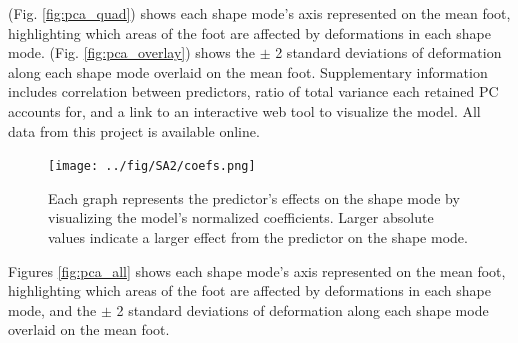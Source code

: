 \documentclass[defaultstyle,11pt]{comps}
\begin{document}
(Fig. \ref{fig:pca_quad}) shows each shape mode's axis represented on the mean foot, highlighting which areas of the foot are affected by deformations in each shape mode.
(Fig. \ref{fig:pca_overlay}) shows the \(\pm\) 2 standard deviations of deformation along each shape mode overlaid on the mean foot.
Supplementary information includes correlation between predictors, ratio of total variance each retained PC accounts for, and a link to an interactive web tool to visualize the model.
All data from this project is available online.

\begin{figure}
\hypertarget{fig:SA2-coefs}{%
\centering
\texttt{[image: ../fig/SA2/coefs.png]}
\caption{Each graph represents the predictor's effects on the shape mode by visualizing the model's normalized coefficients. Larger absolute values indicate a larger effect from the predictor on the shape mode.}\label{fig:SA2-coefs}
}
\end{figure}

Figures \ref{fig:pca_all} shows each shape mode's axis represented on the mean foot, highlighting which areas of the foot are affected by deformations in each shape mode, and the \(\pm\) 2 standard deviations of deformation along each shape mode overlaid on the mean foot.

\begin{pandoccrossrefsubfigures}



\caption[{{[}A{]} Each shape mode's principal axis represented as a heatmap overlaid on the mean foot and shown from 4 different point-of-views. The darker regions represent vertices which are most correlated with the shape mode's principal axis, and therefore see deformations in the shape mode. {[}B{]} Foot shape deformation at +2 and -2 standard deviations along each shape mode's principal axis, overlaid on the mean foot. The point-of-view is set to highlight the major variance along each shape mode's axis.}]{{[}A{]} Each shape mode's principal axis represented as a heatmap overlaid on the mean foot and shown from 4 different point-of-views. The darker regions represent vertices which are most correlated with the shape mode's principal axis, and therefore see deformations in the shape mode. {[}B{]} Foot shape deformation at +2 and -2 standard deviations along each shape mode's principal axis, overlaid on the mean foot. The point-of-view is set to highlight the major variance along each shape mode's axis.}

\label{fig:pca_all}

\end{pandoccrossrefsubfigures}
\end{document}
